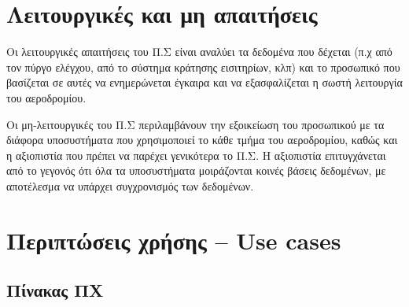 \documentclass[12pt]{article}
\begin{document}
\section{Λειτουργικές και μη απαιτήσεις}

Οι λειτουργικές απαιτήσεις του Π.Σ είναι αναλύει τα δεδομένα που δέχεται (π.χ
από τον πύργο ελέγχου, από το σύστημα κράτησης εισιτηρίων, κλπ) και το
προσωπικό που βασίζεται σε αυτές να ενημερώνεται έγκαιρα και να εξασφαλίζεται η
σωστή λειτουργία του αεροδρομίου.

Οι μη-λειτουργικές του Π.Σ περιλαμβάνουν την εξοικείωση του προσωπικού με τα
διάφορα υποσυστήματα που χρησιμοποιεί το κάθε τμήμα του αεροδρομίου, καθώς και
η αξιοπιστία που πρέπει να παρέχει γενικότερα το Π.Σ. Η αξιοπιστία
επιτυγχάνεται από το γεγονός ότι όλα τα υποσυστήματα μοιράζονται κοινές βάσεις
δεδομένων, με αποτέλεσμα να υπάρχει συγχρονισμός των δεδομένων.

\section{Περιπτώσεις χρήσης -- Use cases}

\subsection{Πίνακας ΠΧ}
\end{document}
